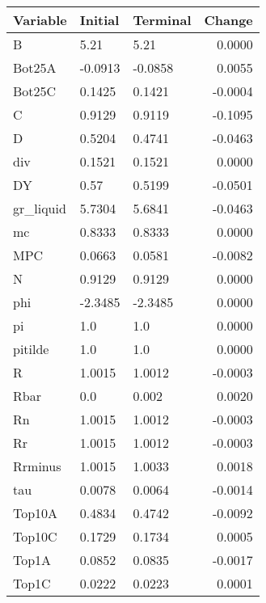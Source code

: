\begin{table}
\centering
\label{tab:stst_comparison_baseline_wedge_permanent}
\begin{tabular}{lllr}
\toprule
                Variable & Initial & Terminal &  Change \\
\midrule
                       B &    5.21 &     5.21 &  0.0000 \\
                  Bot25A & -0.0913 &  -0.0858 &  0.0055 \\
                  Bot25C &  0.1425 &   0.1421 & -0.0004 \\
                       C &  0.9129 &   0.9119 & -0.1095 \\
                       D &  0.5204 &   0.4741 & -0.0463 \\
                     div &  0.1521 &   0.1521 &  0.0000 \\
                      DY &    0.57 &   0.5199 & -0.0501 \\
               gr\_liquid &  5.7304 &   5.6841 & -0.0463 \\
                      mc &  0.8333 &   0.8333 &  0.0000 \\
                     MPC &  0.0663 &   0.0581 & -0.0082 \\
                       N &  0.9129 &   0.9129 &  0.0000 \\
                     phi & -2.3485 &  -2.3485 &  0.0000 \\
                      pi &     1.0 &      1.0 &  0.0000 \\
                 pitilde &     1.0 &      1.0 &  0.0000 \\
                       R &  1.0015 &   1.0012 & -0.0003 \\
                    Rbar &     0.0 &    0.002 &  0.0020 \\
                      Rn &  1.0015 &   1.0012 & -0.0003 \\
                      Rr &  1.0015 &   1.0012 & -0.0003 \\
                 Rrminus &  1.0015 &   1.0033 &  0.0018 \\
                     tau &  0.0078 &   0.0064 & -0.0014 \\
                  Top10A &  0.4834 &   0.4742 & -0.0092 \\
                  Top10C &  0.1729 &   0.1734 &  0.0005 \\
                   Top1A &  0.0852 &   0.0835 & -0.0017 \\
                   Top1C &  0.0222 &   0.0223 &  0.0001 \\

\end{tabular}
\end{table}
